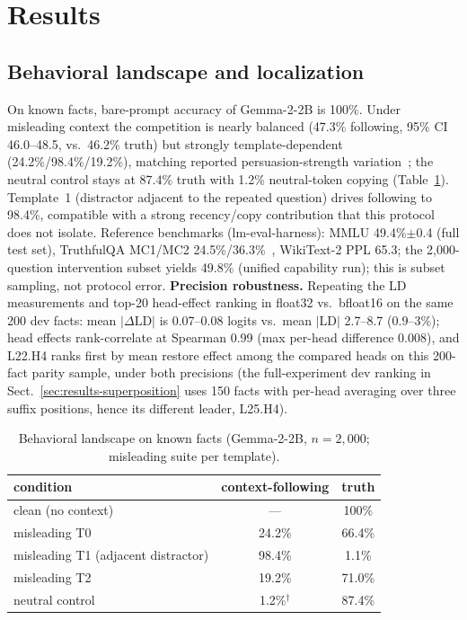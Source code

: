 \documentclass[paper]{ieice}
\newcommand{\emodel}{Gemma-2-2B}
\newcommand{\spec}{L22.H4}
\begin{document}
\section{Results}
\label{sec:results}

\subsection{Behavioral landscape and localization}
\label{sec:results-localization}

On known facts, bare-prompt accuracy of \emodel{} is 100\%. Under
misleading context the competition is nearly balanced (47.3\%
following, 95\% CI 46.0--48.5, vs.\ 46.2\% truth) but strongly
template-dependent (24.2\%/98.4\%/19.2\%), matching reported
persuasion-strength variation~\cite{du2024context}; the neutral control
stays at 87.4\% truth with 1.2\% neutral-token copying
(Table~\ref{tab:behavior}). Template~1 (distractor adjacent to the
repeated question) drives following to 98.4\%, compatible with a
strong recency/copy contribution that this protocol does not isolate.
Reference benchmarks (lm-eval-harness): MMLU 49.4\%$\pm$0.4 (full
test set), TruthfulQA MC1/MC2 24.5\%/36.3\%~\cite{lin2022truthfulqa},
WikiText-2 PPL 65.3; the 2{,}000-question intervention subset yields
49.8\% (unified capability run); this is subset sampling, not protocol error.
\textbf{Precision robustness.} Repeating the LD measurements and
top-20 head-effect ranking in float32 vs.\ bfloat16 on the same 200
dev facts: mean $|\Delta\mathrm{LD}|$ is 0.07--0.08 logits vs.\ mean
$|\mathrm{LD}|$ 2.7--8.7 ($0.9$--$3\%$); head effects rank-correlate
at Spearman 0.99 (max per-head difference 0.008), and \spec{} ranks
first by mean restore effect among the compared heads on this
200-fact parity sample, under both precisions (the full-experiment
dev ranking in Sect.~\ref{sec:results-superposition} uses 150 facts
with per-head averaging over three suffix positions, hence its different leader,
L25.H4).

\begin{table}[t]
\caption{Behavioral landscape on known facts (\emodel{}, $n{=}2{,}000$;
misleading suite per template).}
\label{tab:behavior}
\begin{center}
\begin{tabular}{lcc}
\toprule
condition & context-following & truth \\
\midrule
clean (no context)   & --- & 100\% \\
misleading T0        & 24.2\% & 66.4\% \\
misleading T1 (adjacent distractor) & 98.4\% & 1.1\% \\
misleading T2        & 19.2\% & 71.0\% \\
neutral control      & 1.2\%$^{\dagger}$ & 87.4\% \\
\bottomrule
\end{tabular}
\end{center}
\end{table}
\end{document}
